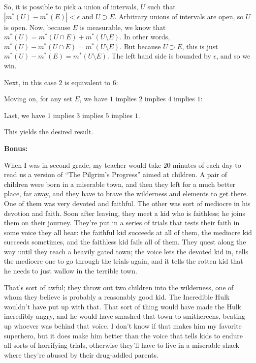 \documentclass[a4paper,12pt]{article}
\newcommand{\tab}{\hspace{4mm}} %
\newcommand{\shunt}{\vspace{20mm}}
\newcommand{\absval}[1]{\left\lvert #1 \right\rvert}
\newcommand{\ep}{\epsilon}
\begin{document}
\tab So, it is possible to pick a union of intervals, $U$ such that $\absval{m^*(U) - m^*(E)} < \ep$ and $U \supset E$. Arbitrary unions of intervals are open, so $U$ is open. Now, because $E$ is measurable, we know that $m^*(U) = m^*(U \cap E) + m^*(U \setminus E)$. In other words, $m^*(U) - m^*(U \cap E) = m^*(U \setminus E)$. But because $U \supset E$, this is just $m^*(U) - m^*(E) = m^*(U \setminus E)$.  The left hand side is bounded by $\ep$, and so we win.

Next, in this case $2$ is equivalent to $6$:

\tab %

Moving on, for any set $E$, we have $1$ implies $2$ implies $4$ implies $1$:

\tab %

Last, we have $1$ implies $3$ implies $5$ implies $1$.

\tab %

This yields the desired result.


\shunt

{\bf Bonus:}

When I was in second grade, my teacher would take 20 minutes of each day to read us a version of ``The Pilgrim's Progress'' aimed at children. A pair of children were born in a miserable town, and then they left for a much better place, far away, and they have to brave the wilderness and elements to get there. One of them was very devoted and faithful. The other was sort of mediocre in his devotion and faith. Soon after leaving, they meet a kid who is faithless; he joins them on their journey. They're put in a series of trials that tests their faith in some voice they all hear: the faithful kid succeeds at all of them, the mediocre kid succeeds sometimes, and the faithless kid fails all of them. They quest along the way until they reach a heavily gated town; the voice lets the devoted kid in, tells the mediocre one to go through the trials again, and it tells the rotten kid that he needs to just wallow in the terrible town.

That's sort of awful; they throw out two children into the wilderness, one of whom they believe is probably a reasonably good kid. The Incredible Hulk wouldn't have put up with that. That sort of thing would have made the Hulk incredibly angry, and he would have smashed that town to smithereens, beating up whoever was behind that voice. I don't know if that makes him my favorite superhero, but it does make him better than the voice that tells kids to endure all sorts of horrifying trials, otherwise they'll have to live in a miserable shack where they're abused by their drug-addled parents.
\shunt
\end{document}
